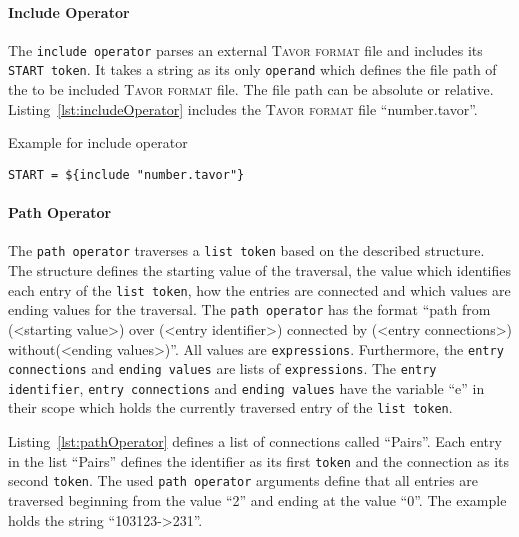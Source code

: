 \paragraph{Include Operator}
\label{subsec:includeOperator}

The \texttt{include operator} parses an external \textsc{Tavor format} file and includes its \texttt{START token}. It takes a string as its only \texttt{operand} which defines the file path of the to be included \textsc{Tavor format} file. The file path can be absolute or relative. Listing~\ref{lst:includeOperator} includes the \textsc{Tavor format} file \enquote{number.tavor}.

\begin{listing}
\caption{Example for include operator}
\label{lst:includeOperator}
\begin{verbatim}
START = ${include "number.tavor"}
\end{verbatim}
\end{listing}

\paragraph{Path Operator}
\label{subsec:pathOperator}

The \texttt{path operator} traverses a \texttt{list token} based on the described structure. The structure defines the starting value of the traversal, the value which identifies each entry of the \texttt{list token}, how the entries are connected and which values are ending values for the traversal. The \texttt{path operator} has the format \enquote{path from (<starting value>) over (<entry identifier>) connected by (<entry connections>) without(<ending values>)}. All values are \texttt{expressions}. Furthermore, the \texttt{entry connections} and \texttt{ending values} are lists of \texttt{expressions}. The \texttt{entry identifier}, \texttt{entry connections} and \texttt{ending values} have the variable \enquote{e} in their scope which holds the currently traversed entry of the \texttt{list token}.

Listing~\ref{lst:pathOperator} defines a list of connections called \enquote{Pairs}. Each entry in the list \enquote{Pairs} defines the identifier as its first \texttt{token} and the connection as its second \texttt{token}. The used \texttt{path operator} arguments define that all entries are traversed beginning from the value \enquote{2} and ending at the value \enquote{0}. The example holds the string \enquote{103123->231}.


